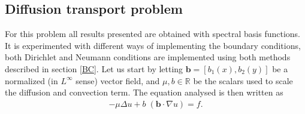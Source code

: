 \subsection{Diffusion transport problem}
For this problem all results presented are obtained with spectral basis functions. It is experimented with different ways of implementing the boundary conditions, both Dirichlet and Neumann conditions are implemented using both methods described in section \ref{BC}.
Let us start by letting $\mathbf{b} = [b_1(x),b_2(y)] $ be a normalized (in $L^{\infty}$ sense) vector field, and $\mu,b \in \mathbb{R}$ be the scalars used to scale the diffusion and convection term. The equation analysed is then written as 
\begin{align}
	-\mu \Delta u + b \; (\mathbf{b} \cdot \nabla u) = f .
	\label{eq:difftransForConditionNumberPlotting}
\end{align}
%
